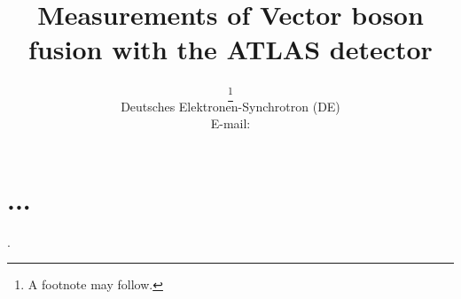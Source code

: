 \documentclass{PoS}
\title{Measurements of Vector boson fusion with the ATLAS detector}
\author{\speaker{Kurt Brendlinger}%
        \thanks{A footnote may follow.}\\
       Deutsches Elektronen-Synchrotron (DE)\\
       E-mail: \email{kurt.brendlinger@cern.ch}}
\begin{document}
\section{...}

\cite{Aaboud:2017fye}.



\end{document}

